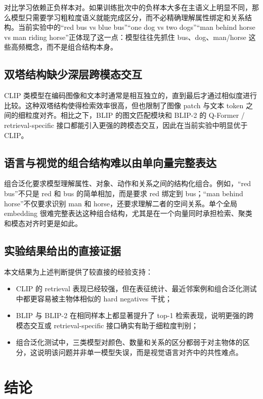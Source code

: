 \documentclass[UTF8,a4paper,10pt]{ctexart}
\begin{document}
对比学习依赖正负样本对。如果训练批次中的负样本大多在主语义上明显不同，那么模型只需要学习粗粒度语义就能完成区分，而不必精确理解属性绑定和关系结构。当前实验中的“red bus vs blue bus”“one dog vs two dogs”“man behind horse vs man riding horse”正体现了这一点：模型往往先抓住 bus、dog、man/horse 这些高频概念，而不是组合结构本身。

\subsection{双塔结构缺少深层跨模态交互}

CLIP 类模型在编码图像和文本时通常是相互独立的，直到最后才通过相似度进行比较。这种双塔结构使得检索效率很高，但也限制了图像 patch 与文本 token 之间的细粒度对齐。相比之下，BLIP 的图文匹配模块和 BLIP-2 的 Q-Former / retrieval-specific 接口都能引入更强的跨模态交互，因此在当前实验中明显优于 CLIP。

\subsection{语言与视觉的组合结构难以由单向量完整表达}

组合泛化要求模型理解属性、对象、动作和关系之间的结构化组合。例如，“red bus”不只是 red 和 bus 的简单相加，而是要求 red 绑定到 bus；“man behind horse”不仅要求识别 man 和 horse，还要求理解二者的空间关系。单个全局 embedding 很难完整表达这种组合结构，尤其是在一个向量同时承担检索、聚类和模态对齐时更是如此。

\subsection{实验结果给出的直接证据}

本文结果为上述判断提供了较直接的经验支持：

\begin{itemize}
    \item CLIP 的 retrieval 表现已经较强，但在表征统计、最近邻案例和组合泛化测试中都更容易被主物体相似的 hard negatives 干扰；
    \item BLIP 与 BLIP-2 在相同样本上都显著提升了 top-1 检索表现，说明更强的跨模态交互或 retrieval-specific 接口确实有助于细粒度判别；
    \item 组合泛化测试中，三类模型对颜色、数量和关系的区分都弱于对主物体的区分，这说明该问题并非单一模型失误，而是视觉语言对齐中的共性难点。
\end{itemize}

\section{结论}
\end{document}
